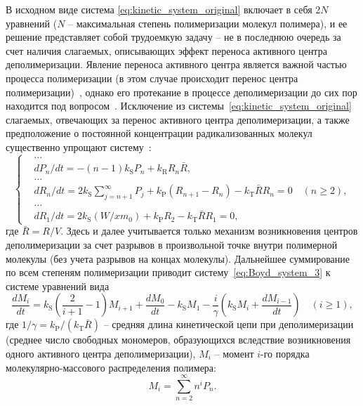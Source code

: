 В исходном виде система \ref{eq:kinetic_system_original} включает в себя 2$N$ уравнений ($N$ -- максимальная степень полимеризации молекул полимера), и ее решение представляет собой трудоемкую задачу -- не в последнюю очередь за счет наличия слагаемых, описывающих эффект переноса активного центра деполимеризации.
Явление переноса активного центра является важной частью процесса полимеризации (в этом случае происходит перенос центра полимеризации)~\cite{chain_transfer_polymerization}, однако его протекание в процессе деполимеризации до сих пор находится под вопросом~\cite{Mita_PMMA_zip_lengths_T}.
Исключение из системы~\ref{eq:kinetic_system_original} слагаемых, отвечающих за перенос активного центра деполимеризации, а также предположение о постоянной концентрации радикализованных молекул существенно упрощают систему~\cite{Boyd_3}:
\begin{equation} \label{eq:Boyd_system_3}
	\left\{
	\begin{aligned}
		&\dots \\
		&d P_n / d t=-(n-1) k_\mathrm{S} P_n + k_\mathrm{R} R_n \bar{R}, \\
		&\dots \\
		&d R_n / d t=2 k_\mathrm{S} \sum_{j=n+1}^{\infty} P_j + k_\mathrm{P}\left(R_{n+1} - R_n\right) - k_\mathrm{T} \bar{R} R_n=0 \quad(n \geq 2), \\
		&\dots \\
		&d R_1 / d t = 2 k_\mathrm{S} \left(W / x m_0\right) + k_\mathrm{P} R_2 - k_\mathrm{T} \bar{R} R_1=0,
	\end{aligned}
	\right.
\end{equation}
где $\bar{R} = R/V$. Здесь и далее учитывается только механизм возникновения центров деполимеризации за счет разрывов в произвольной точке внутри полимерной молекулы (без учета разрывов на концах молекулы).
Дальнейшее суммирование по всем степеням полимеризации приводит систему~\ref{eq:Boyd_system_3} к системе уравнений вида~\cite{Boyd_3}
\begin{equation} \label{eq:moment_equation}
	\frac{d M_i}{d t} = k_\mathrm{S} \left(\frac{2}{i+1} - 1\right) M_{i+1} + \frac{d M_0}{d t} - k_\mathrm{S} M_1 - \frac{i}{\gamma}\left(k_\mathrm{S} M_i + \frac{d M_{i-1}}{dt}\right) \quad(i \geq 1),
\end{equation}
где $1/\gamma = k_\mathrm{P} / (k_\mathrm{T} \bar{R})$ -- средняя длина кинетической цепи при деполимеризации (среднее число свободных мономеров, образующихся вследствие возникновения одного активного центра деполимеризации), $M_i$ -- момент $i$-го порядка молекулярно-массового распределения полимера:
\begin{equation}
	M_i=\sum_{n=2}^{\infty} n^i P_n.
\end{equation}

